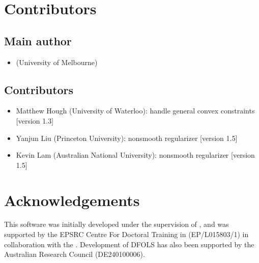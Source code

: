\documentclass[letterpaper,10pt,english]{sphinxmanual}
\begin{document}
\sphinxstepscope


\chapter{Contributors}
\label{\detokenize{contributors:contributors}}\label{\detokenize{contributors::doc}}

\section{Main author}
\label{\detokenize{contributors:main-author}}\begin{itemize}
\item {} 
\sphinxAtStartPar
{} (University of Melbourne)

\end{itemize}


\section{Contributors}
\label{\detokenize{contributors:id1}}\begin{itemize}
\item {} 
\sphinxAtStartPar
Matthew Hough (University of Waterloo): handle general convex constraints {[}version 1.3{]}

\item {} 
\sphinxAtStartPar
Yanjun Liu (Princeton University): nonsmooth regularizer {[}version 1.5{]}

\item {} 
\sphinxAtStartPar
Kevin Lam (Australian National University): nonsmooth regularizer {[}version 1.5{]}

\end{itemize}


\chapter{Acknowledgements}
\label{\detokenize{index:acknowledgements}}
\sphinxAtStartPar
This software was initially developed under the supervision of , and was supported by the EPSRC Centre For Doctoral Training in  (EP/L015803/1) in collaboration with the . Development of DFO\sphinxhyphen{}LS has also been supported by the Australian Research Council (DE240100006).
\end{document}
